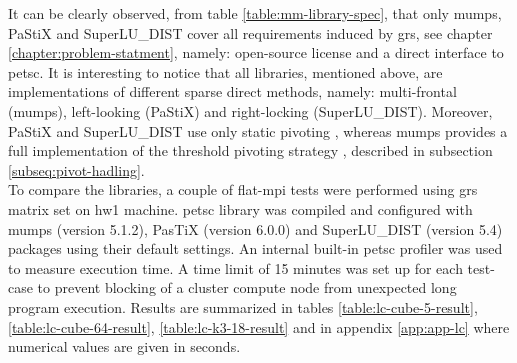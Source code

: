 It can be clearly observed, from table \ref{table:mm-library-spec}, that only \gls{mumps}, PaStiX and SuperLU\_DIST cover all requirements induced by \gls{grs}, see chapter \ref{chapter:problem-statment}, namely: open-source license and a direct interface to \gls{petsc}. It is interesting to notice that all libraries, mentioned above, are implementations of different sparse direct methods, namely: multi-frontal (\gls{mumps}), left-looking (PaStiX) and right-locking (SuperLU\_DIST). Moreover, PaStiX and SuperLU\_DIST use only static pivoting \cite{pastix-manual}, \cite{superlu-manual} whereas \gls{mumps} provides a full implementation of the threshold pivoting strategy \cite{mumps-manual}, described in subsection \ref{subseq:pivot-hadling}.\\


To compare the libraries, a couple of flat-\gls{mpi} tests were performed using \gls{grs} matrix set on \gls{hw1} machine. \gls{petsc} library was compiled and configured with \gls{mumps} (version 5.1.2), PasTiX (version 6.0.0) and SuperLU\_DIST (version 5.4) packages using their default settings. An internal built-in \gls{petsc} profiler was used to measure execution time.  A time limit of 15 minutes was set up for each test-case to prevent blocking of a cluster compute node from unexpected long program execution. Results are summarized in tables \ref{table:lc-cube-5-result}, \ref{table:lc-cube-64-result}, \ref{table:lc-k3-18-result} and in appendix \ref{app:app-lc} where numerical values are given in seconds.\\



